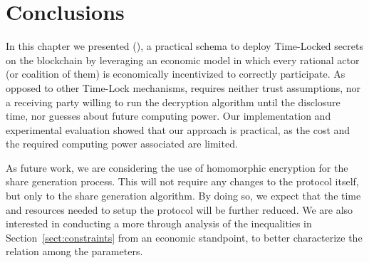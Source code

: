 \section{Conclusions}\label{sect:conclusions}

In this chapter we presented \name (\shortname), a practical schema to deploy Time-Locked secrets on the blockchain by leveraging an economic model in which every rational actor (or coalition of them) is economically incentivized to correctly participate.
As opposed to other Time-Lock mechanisms, \shortname requires neither trust assumptions, nor a receiving party willing to run the decryption algorithm until the disclosure time, nor guesses about future computing power.
Our implementation and experimental evaluation showed that our approach is practical, as the cost and the required computing power associated are limited.

As future work, we are considering the use of homomorphic encryption for the share generation process. This will not require any changes to the protocol itself, but only to the share generation algorithm. By doing so, we expect that the time and resources needed to setup the protocol will be further reduced.
We are also interested in conducting a more through analysis of the inequalities in Section~\ref{sect:constraints} from an economic standpoint, to better characterize the relation among the parameters.
